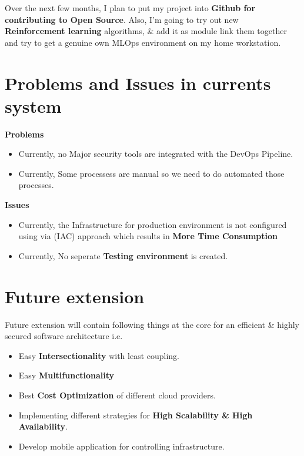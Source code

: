 \documentclass[12pt,oneside,a4paper]{report}
\begin{document}
Over the next few months, I plan to put my project into \textbf{Github for contributing to Open Source}. Also, I’m going to try out new \textbf{Reinforcement learning} algorithms, \& add it as module link them together and try to get a genuine own MLOps environment on my home workstation. 
\section{Problems and Issues in currents system}
\large{\textbf{Problems}}
\fontsize{12pt}{10pt}\selectfont
\begin{itemize}
\item Currently, no Major security tools are integrated with the DevOps Pipeline.
\item Currently, Some processess are manual so we need to do automated those processes.
\end{itemize}
\large{\textbf{Issues}}
\fontsize{12pt}{10pt}\selectfont
\begin{itemize}
\item Currently, the Infrastructure for production environment is not configured using via (IAC) approach which results in \textbf{More Time Consumption}
\item Currently, No seperate \textbf{Testing environment} is created. 
\end{itemize}
\section{Future extension}
\fontsize{12pt}{10pt}\selectfont
Future extension will contain following things at the core for an efficient \& highly secured software architecture i.e.
\begin{itemize}
\item Easy \textbf{Intersectionality} with least coupling.
\item Easy \textbf{Multifunctionality} 
\item Best \textbf{Cost Optimization} of different cloud providers.
\item Implementing different strategies for \textbf{High Scalability \& High Availability}.
\item Develop mobile application for controlling infrastructure.
\end{itemize}
\end{document}
